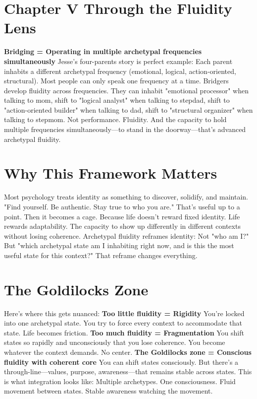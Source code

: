 \section{Chapter V Through the Fluidity Lens}

\textbf{Bridging = Operating in multiple archetypal frequencies simultaneously}
Jesse's four-parents story is perfect example:
Each parent inhabits a different archetypal frequency (emotional, logical, action-oriented, structural). Most people can only speak one frequency at a time.
Bridgers develop fluidity across frequencies.
They can inhabit "emotional processor" when talking to mom, shift to "logical analyst" when talking to stepdad, shift to "action-oriented builder" when talking to dad, shift to "structural organizer" when talking to stepmom.
Not performance. Fluidity.
And the capacity to hold multiple frequencies simultaneously—to stand in the doorway—that's advanced archetypal fluidity.

\section{Why This Framework Matters}

Most psychology treats identity as something to discover, solidify, and maintain.
"Find yourself. Be authentic. Stay true to who you are."
That's useful up to a point. Then it becomes a cage.
Because life doesn't reward fixed identity. Life rewards adaptability. The capacity to show up differently in different contexts without losing coherence.
Archetypal fluidity reframes identity:
Not "who am I?" But "which archetypal state am I inhabiting right now, and is this the most useful state for this context?"
That reframe changes everything.

\section{The Goldilocks Zone}

Here's where this gets nuanced:
\textbf{Too little fluidity = Rigidity}
You're locked into one archetypal state. You try to force every context to accommodate that state. Life becomes friction.
\textbf{Too much fluidity = Fragmentation}
You shift states so rapidly and unconsciously that you lose coherence. You become whatever the context demands. No center.
\textbf{The Goldilocks zone = Conscious fluidity with coherent core}
You can shift states consciously. But there's a through-line—values, purpose, awareness—that remains stable across states.
This is what integration looks like:
Multiple archetypes. One consciousness. Fluid movement between states. Stable awareness watching the movement.

